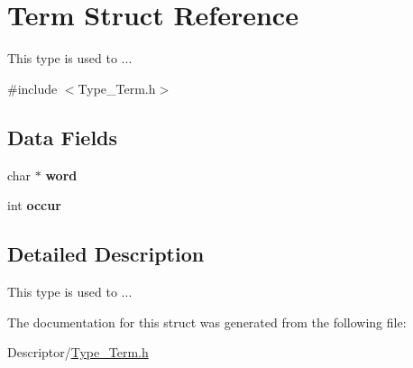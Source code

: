 \hypertarget{structTerm}{\section{Term Struct Reference}
\label{structTerm}
}


This type is used to ...  




{\ttfamily \#include $<$Type\-\_\-\-Term.\-h$>$}

\subsection*{Data Fields}
\begin{DoxyCompactItemize}
\item 
\hypertarget{structTerm_ae660c4ea28be031eab5c0d6b568f7214}{char $\ast$ {\bfseries word}}\label{structTerm_ae660c4ea28be031eab5c0d6b568f7214}

\item 
\hypertarget{structTerm_a84e35ae3d93eb009a8f4b0bc7785fb20}{int {\bfseries occur}}\label{structTerm_a84e35ae3d93eb009a8f4b0bc7785fb20}

\end{DoxyCompactItemize}


\subsection{Detailed Description}
This type is used to ... 

The documentation for this struct was generated from the following file\-:\begin{DoxyCompactItemize}
\item 
Descriptor/\hyperlink{Type__Term_8h}{Type\-\_\-\-Term.\-h}\end{DoxyCompactItemize}
